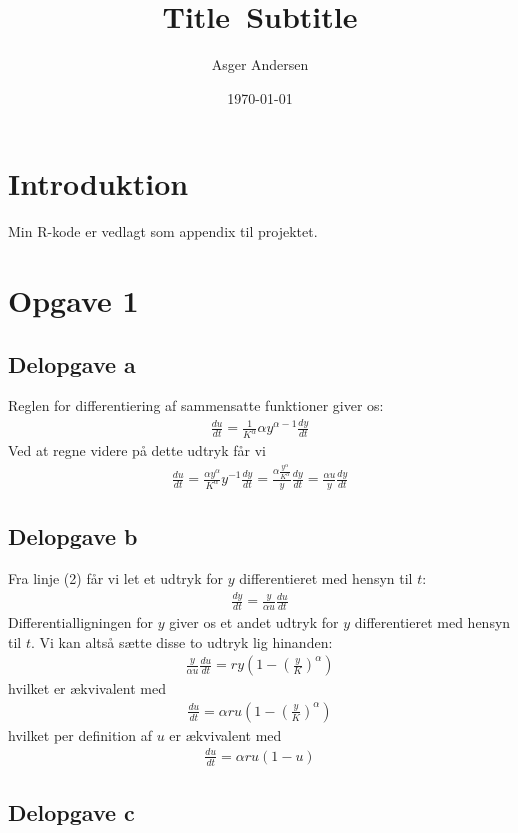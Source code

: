 \documentclass[12pt]{article}
\title{
  Title\
  \large Subtitle
}
\author{Asger Andersen}
\date{\today}
\begin{document}
\section*{Introduktion}

Min R-kode er vedlagt som appendix til projektet.

\section{Opgave 1}

\subsection{Delopgave a}

Reglen for differentiering af sammensatte funktioner giver os:
\begin{align}
\frac{du}{dt}=\frac{1}{K^\alpha}\alpha y^{\alpha-1} \frac{dy}{dt}
\end{align}
Ved at regne videre på dette udtryk får vi
\begin{align}
 \frac{du}{dt} = \frac{\alpha y^\alpha}{K^\alpha} y^{-1} \frac{dy}{dt} = \frac{\alpha \frac{y^\alpha}{K^\alpha}}{y} \frac{dy}{dt} = \frac{\alpha u}{y} \frac{dy}{dt}
\end{align}

\subsection{Delopgave b}

Fra linje (2) får vi let et udtryk for $y$ differentieret med hensyn til $t$:
\begin{align}
 \frac{dy}{dt} = \frac{y}{\alpha u} \frac{du}{dt}
\end{align}
Differentialligningen for $y$ giver os et andet udtryk for $y$ differentieret med hensyn til $t$. Vi kan altså sætte disse to udtryk lig hinanden:
\begin{align}
\frac{y}{\alpha u} \frac{du}{dt} = ry\left(1-\left(\frac{y}{K}\right)^\alpha\right)
\end{align}
hvilket er ækvivalent med
\begin{align}
 \frac{du}{dt} = \alpha r u \left(1-\left(\frac{y}{K}\right)^\alpha\right)
\end{align}
hvilket per definition af $u$ er ækvivalent med
\begin{align}
 \frac{du}{dt} = \alpha r u \left(1-u\right)
\end{align}

\subsection{Delopgave c}
\end{document}
